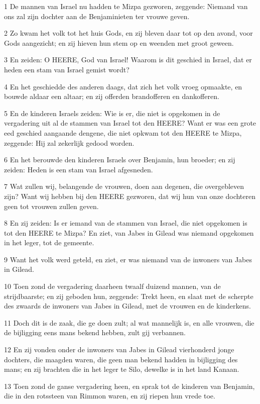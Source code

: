 \par 1 De mannen van Israel nu hadden te Mizpa gezworen, zeggende: Niemand van ons zal zijn dochter aan de Benjaminieten ter vrouwe geven.
\par 2 Zo kwam het volk tot het huis Gods, en zij bleven daar tot op den avond, voor Gods aangezicht; en zij hieven hun stem op en weenden met groot geween.
\par 3 En zeiden: O HEERE, God van Israel! Waarom is dit geschied in Israel, dat er heden een stam van Israel gemist wordt?
\par 4 En het geschiedde des anderen daags, dat zich het volk vroeg opmaakte, en bouwde aldaar een altaar; en zij offerden brandofferen en dankofferen.
\par 5 En de kinderen Israels zeiden: Wie is er, die niet is opgekomen in de vergadering uit al de stammen van Israel tot den HEERE? Want er was een grote eed geschied aangaande dengene, die niet opkwam tot den HEERE te Mizpa, zeggende: Hij zal zekerlijk gedood worden.
\par 6 En het berouwde den kinderen Israels over Benjamin, hun broeder; en zij zeiden: Heden is een stam van Israel afgesneden.
\par 7 Wat zullen wij, belangende de vrouwen, doen aan degenen, die overgebleven zijn? Want wij hebben bij den HEERE gezworen, dat wij hun van onze dochteren geen tot vrouwen zullen geven.
\par 8 En zij zeiden: Is er iemand van de stammen van Israel, die niet opgekomen is tot den HEERE te Mizpa? En ziet, van Jabes in Gilead was niemand opgekomen in het leger, tot de gemeente.
\par 9 Want het volk werd geteld, en ziet, er was niemand van de inwoners van Jabes in Gilead.
\par 10 Toen zond de vergadering daarheen twaalf duizend mannen, van de strijdbaarste; en zij geboden hun, zeggende: Trekt heen, en slaat met de scherpte des zwaards de inwoners van Jabes in Gilead, met de vrouwen en de kinderkens.
\par 11 Doch dit is de zaak, die ge doen zult; al wat mannelijk is, en alle vrouwen, die de bijligging eens mans bekend hebben, zult gij verbannen.
\par 12 En zij vonden onder de inwoners van Jabes in Gilead vierhonderd jonge dochters, die maagden waren, die geen man bekend hadden in bijligging des mans; en zij brachten die in het leger te Silo, dewelke is in het land Kanaan.
\par 13 Toen zond de ganse vergadering heen, en sprak tot de kinderen van Benjamin, die in den rotssteen van Rimmon waren, en zij riepen hun vrede toe.
